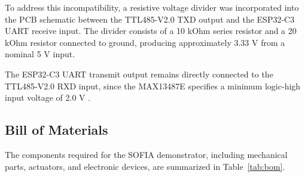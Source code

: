\documentclass[lettersize,journal]{IEEEtran}
\begin{document}
	To address this incompatibility, a resistive voltage
	divider was incorporated into the PCB schematic between
	the TTL485-V2.0 TXD output and the ESP32-C3 UART receive
	input. The divider consists of a 10 kOhm series resistor
	and a 20 kOhm resistor connected to ground, producing
	approximately 3.33 V from a nominal 5 V input.
	
	The ESP32-C3 UART transmit output remains directly
	connected to the TTL485-V2.0 RXD input, since the
	MAX13487E specifies a minimum logic-high input voltage
	of 2.0 V \cite{max13487e}.
	
	
	\subsection{Bill of Materials}
	The components required for the SOFIA demonstrator,
	including mechanical parts, actuators, and electronic
	devices, are summarized in Table~\ref{tab:bom}.
	
	
	
\end{document}
